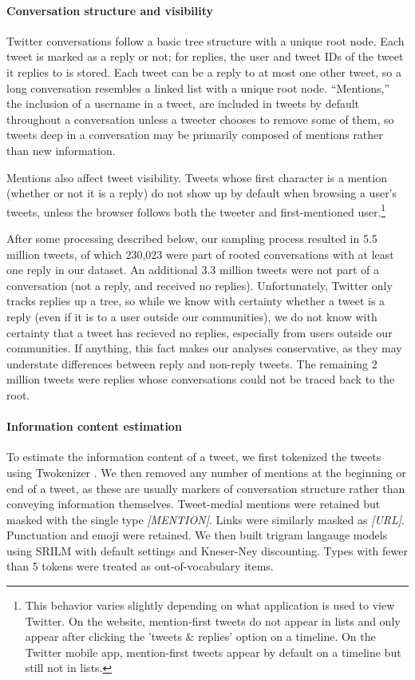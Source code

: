 \documentclass[11pt,letterpaper]{article}
\begin{document}
\paragraph{Conversation structure and visibility}\label{sect:conversation}

Twitter conversations follow a basic tree structure with a unique root node. Each tweet is marked as a reply or not; for replies, the user and tweet IDs of the tweet it replies to is stored. Each tweet can be a reply to at most one other tweet, so a long conversation resembles a linked list with a unique root node. ``Mentions,'' the inclusion of a username in a tweet, are included in tweets by default throughout a conversation unless a tweeter chooses to remove some of them, so tweets deep in a conversation may be primarily composed of mentions rather than new information.

Mentions also affect tweet visibility.  Tweets whose first character is a mention (whether or not it is a reply) do not show up by default when browsing a user's tweets, unless the browser follows both the tweeter and first-mentioned user.\footnote{This behavior varies slightly depending on what application is used to view Twitter.  On the website, mention-first tweets do not appear in lists and only appear after clicking the 'tweets \& replies' option on a timeline. On the Twitter mobile app, mention-first tweets appear by default on a timeline but still not in lists.}

After some processing described below, our sampling process resulted in 5.5 million tweets, of which 230,023 were part of rooted conversations with at least one reply in our dataset. An additional 3.3 million tweets were not part of a conversation (not a reply, and received no replies).  Unfortunately, Twitter only tracks replies up a tree, so while we know with certainty whether a tweet is a reply (even if it is to a user outside our communities), we do not know with certainty that a tweet has recieved no replies, especially from users outside our communities. If anything, this fact makes our analyses conservative, as they may understate differences between reply and non-reply tweets. The remaining 2 million tweets were replies whose conversations could not be traced back to the root.

\paragraph{Information content estimation}

To estimate the information content of a tweet, we first tokenized the tweets using Twokenizer \cite{owoputi2013}. We then removed any number of mentions at the beginning or end of a tweet, as these are usually markers of conversation structure rather than conveying information themselves.  Tweet-medial mentions were retained but masked with the single type {\it [MENTION]}. Links were similarly masked as {\it [URL]}. Punctuation and emoji were retained. We then built trigram langauge models using SRILM with default settings and Kneser-Ney discounting.  Types with fewer than 5 tokens were treated as out-of-vocabulary items. 
\end{document}
